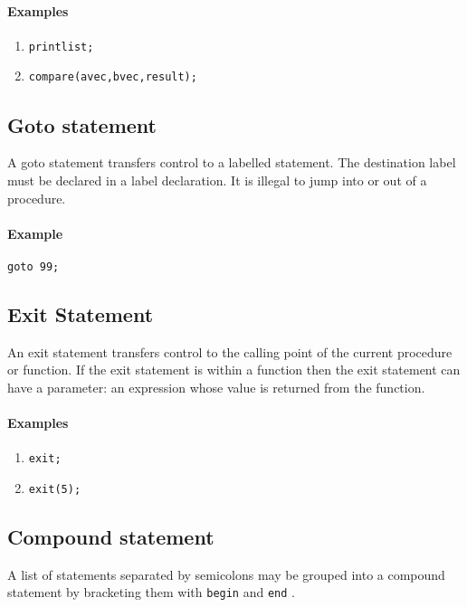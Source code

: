 {\paragraph{Examples}

\begin{enumerate}
\item \texttt{printlist;}
\item \texttt{compare(avec,bvec,result);}
\end{enumerate}

\subsection{Goto statement}

A goto statement transfers control to a labelled statement. The destination
label must be declared in a label declaration. It is illegal to
jump into or out of a procedure.


\paragraph{Example}

\texttt{goto 99;}


\subsection{Exit Statement}

An exit statement transfers control to the calling point of the current procedure
or function. If the exit statement is within a function then the exit statement
can have a parameter: an expression whose value is returned from the function.


\paragraph{Examples}

\begin{enumerate}
\item \texttt{exit;}
\item \texttt{exit(5);}
\end{enumerate}

\subsection{Compound statement}

A list of statements separated by semicolons may be grouped into a compound
statement by bracketing them with \texttt{begin} and \texttt{end} .


}
